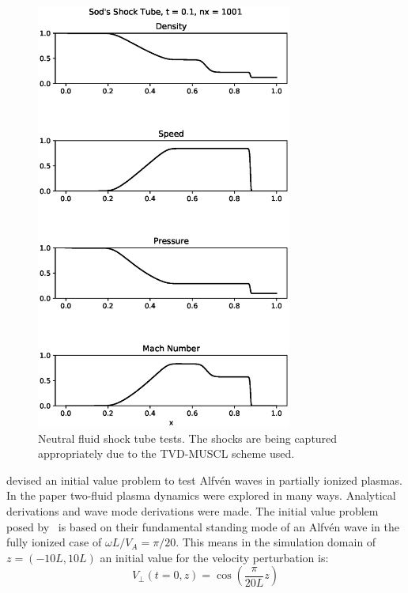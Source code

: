 \documentclass[12pt,upcase]{umlthesis}
\begin{document}
\begin{figure}[ht!]
	\centering
	\includegraphics[width=0.75\textwidth]{images/shocktube.eps}
	\caption{Neutral fluid shock tube tests. The shocks are being captured appropriately due to the TVD-MUSCL scheme used.}\label{fig:shocktube}
\end{figure}

\citet{Soler2013} devised an initial value problem to test Alfv\'en waves in partially ionized plasmas. In the paper two-fluid plasma dynamics were explored in many ways. Analytical derivations and wave mode derivations were made. The initial value problem posed by~\citet{Soler2013} is based on their fundamental standing mode of an Alfv\'en wave in the fully ionized case of $\omega L / V_A = \pi / 20$. This means in the simulation domain of $z = (-10L,10L)$ an initial value for the velocity perturbation is:
\begin{equation}\label{eq:solerintial}
	V_{\perp}(t=0,z) = \cos{(\frac{\pi}{20 L} z)}
\end{equation}
\end{document}
